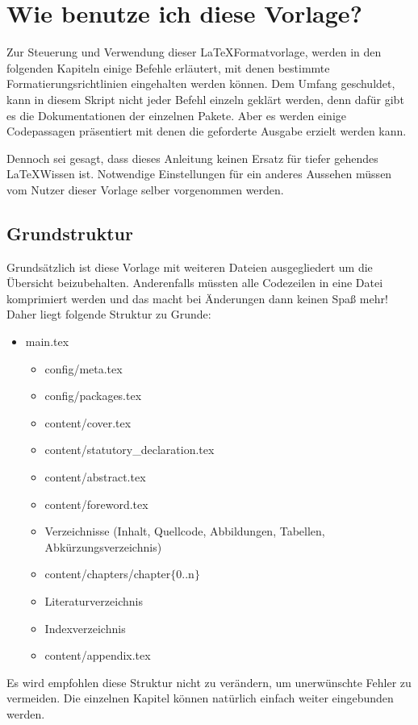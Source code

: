 \chapter{Wie benutze ich diese Vorlage?}
	\label{chap:wiebenutzeichdiesevorlage}
	
	
	Zur Steuerung und Verwendung dieser \LaTeX Formatvorlage, werden in den folgenden Kapiteln einige Befehle erläutert, mit denen bestimmte Formatierungsrichtlinien eingehalten
	werden können. Dem Umfang geschuldet, kann in diesem Skript nicht jeder Befehl einzeln geklärt werden, denn dafür gibt es die Dokumentationen der einzelnen 
	Pakete. Aber es werden einige Codepassagen präsentiert mit denen die geforderte Ausgabe erzielt werden kann.
	
	Dennoch sei gesagt, dass dieses Anleitung keinen Ersatz für tiefer gehendes \LaTeX Wissen ist. Notwendige Einstellungen für ein anderes Aussehen müssen vom Nutzer dieser Vorlage selber vorgenommen werden.
	
	\section{Grundstruktur}
		\label{sec:grundstruktur}
		Grundsätzlich ist diese Vorlage mit weiteren Dateien ausgegliedert um die Übersicht beizubehalten.  Anderenfalls müssten alle Codezeilen in eine Datei komprimiert werden und das macht bei Änderungen dann keinen Spaß mehr!
		Daher liegt folgende Struktur zu Grunde:
		\begin{itemize}[noitemsep]
			\item main.tex
			\begin{itemize}[noitemsep]
				\item config/meta.tex
				\item config/packages.tex
				\item content/cover.tex
				\item content/statutory\_declaration.tex
				\item content/abstract.tex
				\item content/foreword.tex
				\item Verzeichnisse (Inhalt, Quellcode, Abbildungen, Tabellen, Abkürzungsverzeichnis)
				\item content/chapters/chapter$\{$0..n$\}$
				\item Literaturverzeichnis
				\item Indexverzeichnis
				\item content/appendix.tex
			\end{itemize}
		\end{itemize}
		Es wird empfohlen diese Struktur nicht zu verändern, um unerwünschte Fehler zu vermeiden. Die einzelnen Kapitel können natürlich einfach weiter eingebunden werden.	
		
